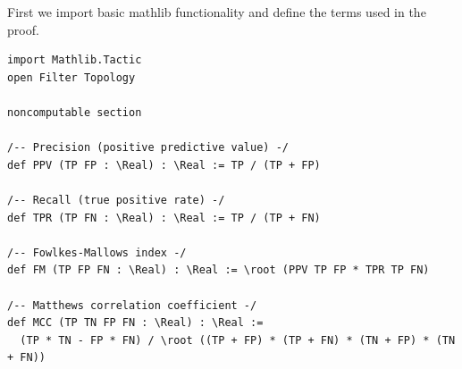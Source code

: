 \documentclass{article}
\begin{document}

\lstset{style=leanpretty}

%

First we import basic mathlib functionality and define the terms used in the proof.

\begin{lstlisting}[language=lean]
import Mathlib.Tactic
open Filter Topology

noncomputable section

/-- Precision (positive predictive value) -/
def PPV (TP FP : \Real) : \Real := TP / (TP + FP)

/-- Recall (true positive rate) -/
def TPR (TP FN : \Real) : \Real := TP / (TP + FN)

/-- Fowlkes-Mallows index -/
def FM (TP FP FN : \Real) : \Real := \root (PPV TP FP * TPR TP FN)

/-- Matthews correlation coefficient -/
def MCC (TP TN FP FN : \Real) : \Real :=
  (TP * TN - FP * FN) / \root ((TP + FP) * (TP + FN) * (TN + FP) * (TN + FN))
\end{lstlisting}
\end{document}
